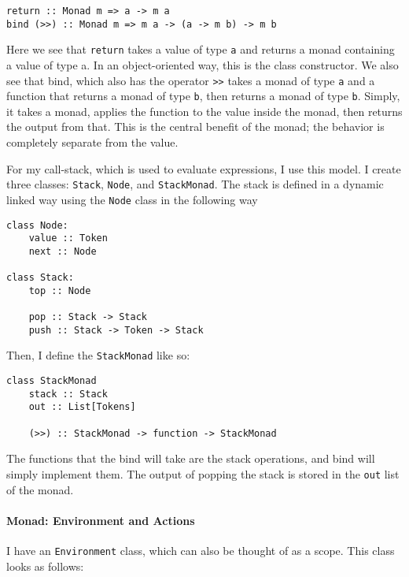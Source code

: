\documentclass[11pt]{article}
\begin{document}
\begin{verbatim}
return :: Monad m => a -> m a
bind (>>) :: Monad m => m a -> (a -> m b) -> m b
\end{verbatim}

Here we see that \texttt{return} takes a value of type \texttt{a} and
returns a monad containing a value of type a. In an object-oriented way,
this is the class constructor. We also see that bind, which also has the
operator \texttt{\textgreater{}\textgreater{}} takes a monad of type
\texttt{a} and a function that returns a monad of type \texttt{b}, then
returns a monad of type \texttt{b}. Simply, it takes a monad, applies
the function to the value inside the monad, then returns the output from
that. This is the central benefit of the monad; the behavior is
completely separate from the value.

For my call-stack, which is used to evaluate expressions, I use this
model. I create three classes: \texttt{Stack}, \texttt{Node}, and
\texttt{StackMonad}. The stack is defined in a dynamic linked way using
the \texttt{Node} class in the following way

\begin{verbatim}
class Node:
    value :: Token
    next :: Node

class Stack:
    top :: Node
    
    pop :: Stack -> Stack
    push :: Stack -> Token -> Stack
\end{verbatim}

Then, I define the \texttt{StackMonad} like so:

\begin{verbatim}
class StackMonad
    stack :: Stack
    out :: List[Tokens]
    
    (>>) :: StackMonad -> function -> StackMonad
\end{verbatim}

The functions that the bind will take are the stack operations, and bind
will simply implement them. The output of popping the stack is stored in
the \texttt{out} list of the monad.

\hypertarget{monad-environment-and-actions}{%
\paragraph{Monad: Environment and
Actions}\label{monad-environment-and-actions}}

I have an \texttt{Environment} class, which can also be thought of as a
scope. This class looks as follows:
\end{document}
